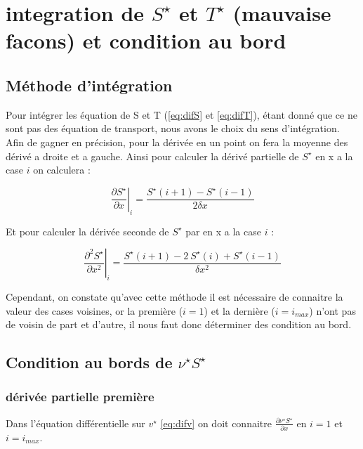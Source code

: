\section{integration de $S^{\star}$ et $T^{\star}$ (mauvaise facons) et condition au bord}

\subsection{Méthode d'intégration}

Pour intégrer les équation de S et T (\eqref{eq:difS} et \eqref{eq:difT}), étant donné que ce ne sont pas des équation de transport, nous avons le choix du sens d'intégration. Afin de gagner en précision, pour la dérivée en un point on fera la moyenne des dérivé a droite et a gauche. Ainsi pour calculer la dérivé partielle de $S^{\star}$ en x a la case $i$ on calculera :

\begin{equation}
  \left. \frac{\partial S^{\star}}{\partial x} \right|_i = \frac{S^{\star}(i+1)-S^{\star}(i-1)}{2\delta x} \label{eq:dif_ordre1}
\end{equation}

Et pour calculer la dérivée seconde de $S^{\star}$ par en x a la case $i$ :

\begin{equation}
  \left. \frac{\partial^2 S^{\star}}{\partial x^2}\right|_i=\frac{S^{\star}(i+1)-2\ S^{\star}(i) +S^{\star}(i-1)}{\delta x^2} \label{eq:dif_ordre2}
\end{equation}

Cependant, on constate qu'avec cette méthode il est nécessaire de connaitre la valeur des cases voisines, or la première ($i=1$) et la dernière ($i=i_{max}$) n'ont pas de voisin de part et d'autre, il nous faut donc déterminer des condition au bord.


\subsection{Condition au bords de $\nu^{\star}S^{\star}$}

\subsubsection{dérivée partielle première}

Dans l'équation différentielle sur $v^{\star}$ \eqref{eq:difv} on doit connaitre $\frac{\partial \nu^{\star} S^{\star}}{\partial x}$ en $i=1$ et $i=i_{max}$.

